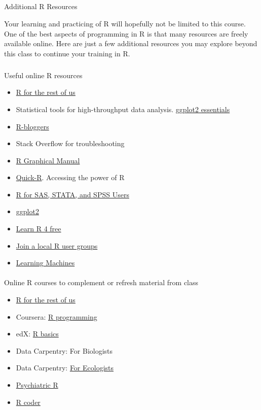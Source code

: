 \documentclass[
  letterpaper,
  DIV=11,
  numbers=noendperiod]{scrartcl}
\makeatletter
\let\oldparagraph\paragraph
\renewcommand{\paragraph}{
    \@ifstar
      \xxxParagraphStar
      \xxxParagraphNoStar
  }
\newcommand{\xxxParagraphStar}[1]{\oldparagraph*{#1}\mbox{}}
\newcommand{\xxxParagraphNoStar}[1]{\oldparagraph{#1}\mbox{}}
\let\oldsubparagraph\subparagraph
\renewcommand{\subparagraph}{
    \@ifstar
      \xxxSubParagraphStar
      \xxxSubParagraphNoStar
  }
\newcommand{\xxxSubParagraphStar}[1]{\oldsubparagraph*{#1}\mbox{}}
\newcommand{\xxxSubParagraphNoStar}[1]{\oldsubparagraph{#1}\mbox{}}
\providecommand{\tightlist}{%
  \setlength{\itemsep}{0pt}\setlength{\parskip}{0pt}}\usepackage{longtable,booktabs,array}
\makeatother
\begin{document}
\subparagraph{Additional R Resources}\label{additional-r-resources}

Your learning and practicing of R will hopefully not be limited to this
course. One of the best aspects of programming in R is that many
resources are freely available online. Here are just a few additional
resources you may explore beyond this class to continue your training in
R.

\subparagraph{Useful online R
resources}\label{useful-online-r-resources}

\begin{itemize}
\tightlist
\item
  \href{https://rfortherestofus.com/}{R for the rest of us}
\item
  Statistical tools for high-throughput data analysis.
  \href{http://www.sthda.com/english/wiki/ggplot2-essentials\#google_vignette}{ggplot2
  essentials}
\item
  \href{http://www.r-bloggers.com/}{R-bloggers}
\item
  Stack Overflow for troubleshooting
\item
  \href{https://www.imsbio.co.jp/RGM/R_image_list}{R Graphical Manual}
\item
  \href{http://www.statmethods.net/}{Quick-R}. Accessing the power of R
\item
  \href{http://r4stats.com/}{R for SAS, STATA, and SPSS Users}
\item
  \href{https://ggplot2.tidyverse.org/}{ggplot2}
\item
  \href{https://www.learnr4free.com/en/index.html}{Learn R 4 free}
\item
  \href{https://www.r-consortium.org/blog/2019/09/09/r-community-explorer-r-user-groups}{Join
  a local R user groups}
\item
  \href{https://blog.ephorie.de/learning-r-the-ultimate-introduction-incl-machine-learning}{Learning
  Machines}
\end{itemize}

\paragraph{Online R courses to complement or refresh material from
class}\label{online-r-courses-to-complement-or-refresh-material-from-class}

\begin{itemize}
\tightlist
\item
  \href{https://rfortherestofus.com/}{R for the rest of us}
\item
  Coursera: \href{https://www.coursera.org/learn/r-programming}{R
  programming}
\item
  edX: \href{https://www.edx.org/course/data-science-r-basics}{R basics}
\item
  Data Carpentry: For Biologists
\item
  Data Carpentry:
  \href{https://datacarpentry.org/lessons/\#ecology-workshop}{For
  Ecologists}
\item
  \href{https://psyteachr.github.io/}{Psychiatric R}
\item
  \href{https://r-coder.com/}{R coder}
\end{itemize}
\end{document}
